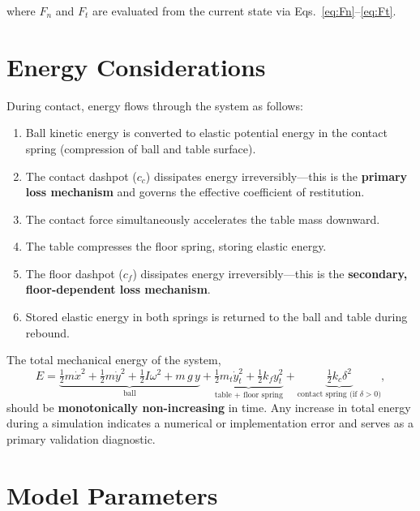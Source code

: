 \documentclass[11pt,a4paper]{article}
\begin{document}
where $F_n$ and $F_t$ are evaluated from the current state via
Eqs.~\eqref{eq:Fn}--\eqref{eq:Ft}.

\section{Energy Considerations}

During contact, energy flows through the system as follows:

\begin{enumerate}[nosep]
  \item Ball kinetic energy is converted to elastic potential energy in the
    contact spring (compression of ball and table surface).
  \item The contact dashpot ($c_c$) dissipates energy irreversibly---this is the
    \textbf{primary loss mechanism} and governs the effective coefficient of
    restitution.
  \item The contact force simultaneously accelerates the table mass downward.
  \item The table compresses the floor spring, storing elastic energy.
  \item The floor dashpot ($c_f$) dissipates energy irreversibly---this is the
    \textbf{secondary, floor-dependent loss mechanism}.
  \item Stored elastic energy in both springs is returned to the ball and table
    during rebound.
\end{enumerate}

The total mechanical energy of the system,
\begin{equation}
  E = \underbrace{\tfrac{1}{2}m\dot{x}^2
      + \tfrac{1}{2}m\dot{y}^2
      + \tfrac{1}{2}I\omega^2
      + m\,g\,y}_{\text{ball}}
    + \underbrace{\tfrac{1}{2}m_t\dot{y}_t^2
      + \tfrac{1}{2}k_f y_t^2}_{\text{table + floor spring}}
    + \underbrace{\tfrac{1}{2}k_c\delta^2}_{\text{contact spring (if } \delta > 0\text{)}},
  \label{eq:energy}
\end{equation}
should be \textbf{monotonically non-increasing} in time. Any increase in total
energy during a simulation indicates a numerical or implementation error and
serves as a primary validation diagnostic.

\section{Model Parameters}
\end{document}
